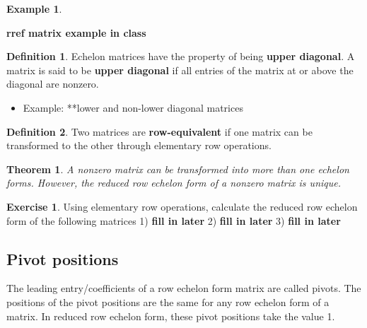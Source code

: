 \documentclass[
]{book}
\providecommand{\tightlist}{%
  \setlength{\itemsep}{0pt}\setlength{\parskip}{0pt}}
\newtheorem{theorem}{Theorem}[chapter]
\theoremstyle{definition}
\newtheorem{definition}{Definition}[chapter]
\theoremstyle{definition}
\newtheorem{example}{Example}[chapter]
\theoremstyle{definition}
\newtheorem{exercise}{Exercise}[chapter]
\theoremstyle{remark}
\begin{document}
\begin{example}
\protect\hypertarget{exm:unlabeled-div-60}{}\label{exm:unlabeled-div-60}

\textbf{rref matrix example in class}

\end{example}

\begin{definition}
\protect\hypertarget{def:unnamed-chunk-55}{}{\label{def:unnamed-chunk-55} }Echelon matrices have the property of being \textbf{upper diagonal}. A matrix is said to be \textbf{upper diagonal} if all entries of the matrix at or above the diagonal are nonzero.
\end{definition}

\begin{itemize}
\tightlist
\item
  Example: **lower and non-lower diagonal matrices
\end{itemize}

\begin{definition}
\protect\hypertarget{def:unnamed-chunk-56}{}{\label{def:unnamed-chunk-56} }Two matrices are \textbf{row-equivalent} if one matrix can be transformed to the other through elementary row operations.
\end{definition}

\begin{theorem}
\protect\hypertarget{thm:unnamed-chunk-57}{}{\label{thm:unnamed-chunk-57} }A nonzero matrix can be transformed into more than one echelon forms. However, the reduced row echelon form of a nonzero matrix is unique.
\end{theorem}

\begin{exercise}
\protect\hypertarget{exr:unnamed-chunk-58}{}{\label{exr:unnamed-chunk-58} }Using elementary row operations, calculate the reduced row echelon form of the following matrices
1) \textbf{fill in later}
2) \textbf{fill in later}
3) \textbf{fill in later}
\end{exercise}

\hypertarget{pivot-positions}{%
\subsection{Pivot positions}\label{pivot-positions}}

The leading entry/coefficients of a row echelon form matrix are called pivots. The positions of the pivot positions are the same for any row echelon form of a matrix. In reduced row echelon form, these pivot positions take the value 1.
\end{document}

